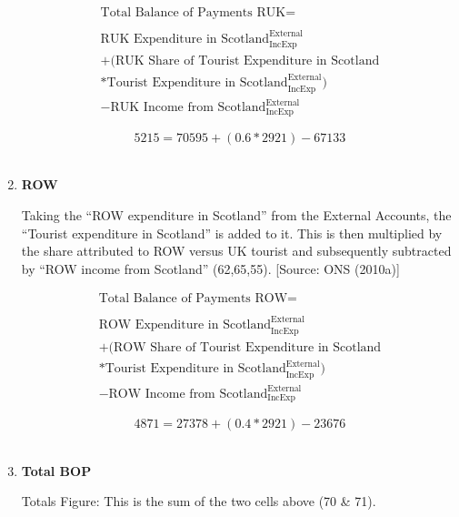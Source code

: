 \begin{enumerate}
\begin{equation}
\begin{split}
\text{Total Balance of Payments RUK} =  \\ \\
\text{RUK Expenditure in Scotland}^\text{External}_\text{IncExp}\\
+(\text{RUK Share of Tourist Expenditure in Scotland}\\
*\text{Tourist  Expenditure in Scotland}^\text{External}_\text{IncExp})\\
-\text{RUK Income from Scotland}^\text{External}_\text{IncExp}
\end{split} \label{eq:2.5.73}
\end{equation}

\begin{equation} \nonumber
5215 = 70595+(0.6*2921)-67133
\end{equation}\\


\item \textbf {ROW}

Taking the “ROW expenditure in Scotland” from the External Accounts, the “Tourist expenditure in Scotland” is added to it. This is then multiplied by the share attributed to ROW versus UK tourist and subsequently subtracted by “ROW income from Scotland” (62,65,55). [Source: ONS (2010a)]

\begin{equation}
\begin{split}
\text{Total Balance of Payments ROW} =  \\ \\
\text{ROW Expenditure in Scotland}^\text{External}_\text{IncExp}\\
+(\text{ROW Share of Tourist Expenditure in Scotland}\\
*\text{Tourist  Expenditure in Scotland}^\text{External}_\text{IncExp})\\
-\text{ROW Income from Scotland}^\text{External}_\text{IncExp}
\end{split} \label{eq:2.5.74}
\end{equation}

\begin{equation} \nonumber
4871 = 27378+(0.4*2921)-23676
\end{equation}\\


\item \textbf {Total BOP}

Totals Figure: This is the sum of the two cells above (70 \& 71).


\end{enumerate}
